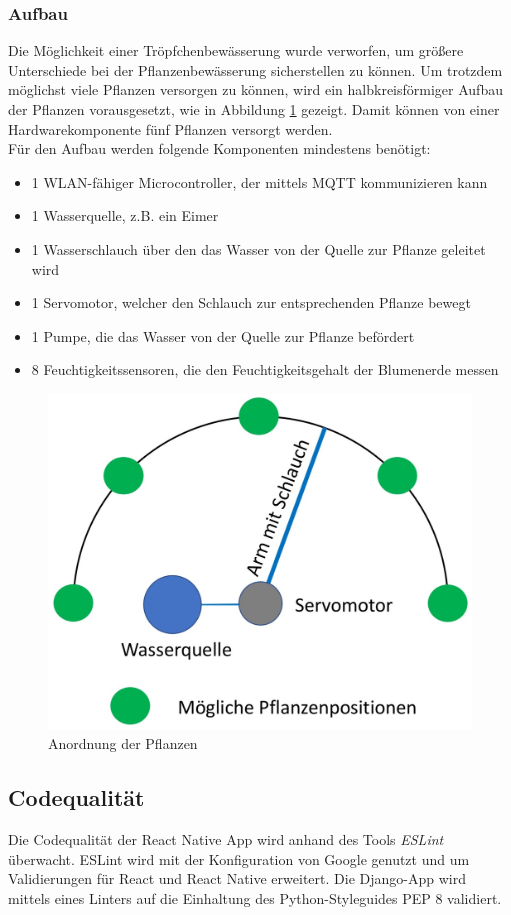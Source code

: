         \subsubsection{Aufbau}
        Die Möglichkeit einer Tröpfchenbewässerung wurde verworfen, um größere Unterschiede bei der Pflanzenbewässerung sicherstellen zu können. Um trotzdem möglichst viele Pflanzen versorgen zu können, wird ein halbkreisförmiger Aufbau der Pflanzen vorausgesetzt, wie in Abbildung \ref{fig:position} gezeigt. Damit können von einer Hardwarekomponente fünf Pflanzen versorgt werden. \\
        
        Für den Aufbau werden folgende Komponenten mindestens benötigt:
        \begin{itemize}
            \item 1 WLAN-fähiger Microcontroller, der mittels MQTT kommunizieren kann
            \item 1 Wasserquelle, z.B. ein Eimer
            \item 1 Wasserschlauch über den das Wasser von der Quelle zur Pflanze geleitet wird
            \item 1 Servomotor, welcher den Schlauch zur entsprechenden Pflanze bewegt
            \item 1 Pumpe, die das Wasser von der Quelle zur Pflanze befördert
           \item 8 Feuchtigkeitssensoren, die den Feuchtigkeitsgehalt der Blumenerde messen
        \end{itemize}
        \begin{figure}
            \centering
            \includegraphics[width=0.6\linewidth]{Pictures/Konzept/Position}
            \caption{Anordnung der Pflanzen}
            \label{fig:position}
        \end{figure}
    
        \subsection{Codequalität}
        Die Codequalität der React Native App wird anhand des Tools \textit{ESLint} überwacht. ESLint wird mit der Konfiguration von Google genutzt und um Validierungen für React und React Native erweitert.
        Die Django-App wird mittels eines Linters auf die Einhaltung des Python-Styleguides PEP 8 validiert.
        